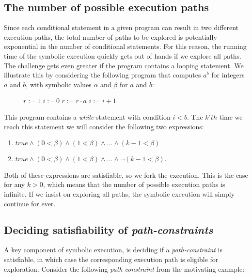 	\subsection{The number of possible execution paths} 
		Since each conditional statement in a given program can result in two different execution paths, the total number of paths to be explored is potentially exponential in the number of conditional statements. 
		For this reason, the running time of the symbolic execution quickly gets out of hands if we explore all paths. 
		 The challenge gets even greater if the program contains a looping statement. We illustrate this by considering the following program that computes $a^b$ for integers $a$ and $b$, with symbolic values $\alpha$ and $\beta$ for $a$ and $b$:
		\begin{figure}[!h]
			\begin{algorithmic}
				\State $r := 1$
				\State $i := 0$
					\State $ r := r\cdot a$
					\State $ i := i + 1$
				\EndWhile
				\State {}
				\EndProcedure
			\end{algorithmic}
		\end{figure}
		\pow{}
		
	This program contains a \textsl{while}-statement with condition $i < b$. The $k'th$ time we reach this statement we will consider the following two expressions:
	\begin{enumerate}
		\item $true \land (0 < \beta) \land (1 < \beta) \land \ldots \land (k-1 < \beta) $
		\item $true \land (0 < \beta) \land (1 < \beta) \land \ldots \land \neg (k-1 < \beta) $.
	\end{enumerate}
	Both of these expressions are satisfiable, so we fork the execution. This is the case for any $k > 0$, which means that the number of possible execution paths is infinite. If we insist on exploring all paths, the symbolic execution will simply continue for ever. 
	
	\subsection{Deciding satisfiability of \emph{path-constraints}}
	A key component of symbolic execution, is deciding if a \emph{path-constraint} is satisfiable, in which case the corresponding execution path is eligible for exploration. Consider the following \emph{path-constraint} from the motivating example:
	
